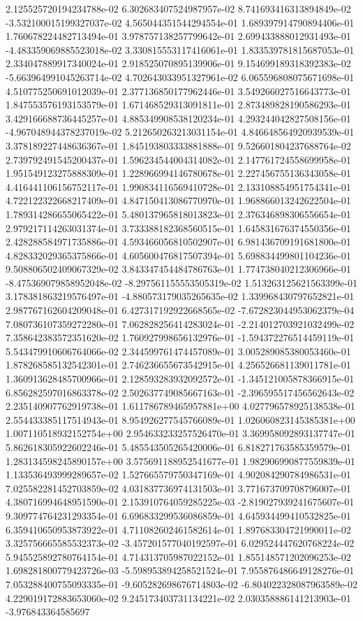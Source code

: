 	2.125525720194234788e-02	6.302683407524987957e-02	8.741693416313894849e-02	-3.532100015199327037e-02	4.565044351544294554e-01	1.689397914790894406e-01	1.760678224482713494e-01	3.978757138257799642e-01	2.699433888012931493e-01	-4.483359069885523018e-02	3.330815553117416061e-01	1.833539781815687053e-01	2.334047889917340024e-01	2.918525070895139906e-01	9.154699189318392383e-02	-5.663964991045263714e-02	4.702643033951327961e-02	6.065596808075671698e-01	4.510775250691012039e-01	2.377136850177962446e-01	3.549266027516643773e-01	1.847553576193153579e-01	1.671468529313091811e-01	2.873489828190586293e-01	3.429166688736445257e-01	4.885349908538120234e-01	4.293244042827508156e-01	-4.967048944378237019e-02	5.212650263213031154e-01	4.846648564920939539e-01	3.378189227448636367e-01	1.845193803333881888e-01	9.526601804237688764e-02	2.739792491545200437e-01	1.596234544004314082e-01	2.147761724558699958e-01	1.951549123275888309e-01	1.228966994146780678e-01	2.227456755136343058e-01	4.416441106156752117e-01	1.990834116569410728e-01	2.133108854951754341e-01	4.722122322668217409e-01	4.847150413086770970e-01	1.968866013242622504e-01	1.789314286655065422e-01	5.480137965818013823e-01	2.376346898306556654e-01	2.979217114263031374e-01	3.733388182368560515e-01	1.645831676374550356e-01	2.428288584971735886e-01	4.593466056810502907e-01	6.981436709191681800e-01	4.828332029365375866e-01	4.605600476817507394e-01	5.698834499801104236e-01	9.508806502409067329e-02	3.843347454484786763e-01	1.774738040212306966e-01	-8.475369079858952048e-02	-8.297561155553505319e-02	1.513263125621563399e-01	3.178381863219576497e-01	-4.880573179035265635e-02	1.339968430797652821e-01	2.987767162604209048e-01	6.427317192922668565e-02	-7.672823044953062379e-04	7.080736107359272280e-01	7.062828256414283024e-01	-2.214012703921032499e-02	7.358642383572351620e-02	1.760927998656132976e-01	-1.594372276514459119e-01	5.543479910606764066e-02	2.344599761474457089e-01	3.005289085380053460e-01	1.878268585132542301e-01	2.746236655673542915e-01	4.256526681139011781e-01	1.360913628485700966e-01	2.128593283932092572e-01	-1.345121005878366915e-01	6.856282597016863378e-02	2.502637749085667163e-01	-2.396595517456562643e-02	2.235140907762919738e-01	1.611786789465957881e+00	4.027796578925138538e-01	2.554433385117514943e-01	8.954926277545766089e-01	1.026060823145385381e+00	1.007110518932152754e+00	2.954633233257526470e-01	3.369958092893137747e-01	5.862618305922602246e-01	5.485543505265420006e-01	6.818271763585359579e-01	1.283134598245890157e+00	3.575691188952541677e-01	1.982906990877559839e-01	1.133536493999289657e-02	1.527665579750347169e-01	4.902084290784986531e-01	7.025582281452703859e-02	4.031837736974131503e-01	3.771673709708796007e-01	4.380716994648951590e-01	2.153910764059285225e-03	-2.819027939241675607e-01	9.309774764231293354e-01	6.696833299536086859e-01	4.645934499410532825e-01	6.359410650953873922e-01	4.711082602461582614e-01	1.897683304721990011e-02	3.325756665585532373e-02	-3.457201577040192597e-01	6.029524447620768224e-02	5.945525892780764154e-01	4.714313705987022152e-01	1.855148571202096253e-02	1.698281800779423726e-03	-5.598953894258521524e-01	7.955876486649128276e-01	7.053288400755093335e-01	-9.605282698676714803e-02	-6.804022328087963589e-02	4.229019172883653060e-02	9.245173403731134221e-02	2.030358886141213903e-01	-3.976843364585697